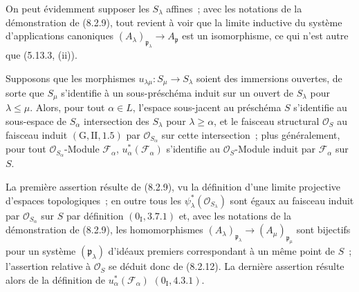On peut évidemment supposer les $S_\lambda$ affines~; avec les notations de
la démonstration de (8.2.9), tout revient à voir que la limite inductive du
système d'applications canoniques
$(A_\lambda)_{\mathfrak p_\lambda}\to A_{\mathfrak p}$ est un isomorphisme,
ce qui n'est autre que (5.13.3, (ii)).

\begin{proposition}[8.2.13]
\label{IV.8.2.13-fr}
Supposons que les morphismes $u_{\lambda\mu}:S_\mu\to S_\lambda$ soient des
immersions ouvertes, de sorte que $S_\mu$ s'identifie à un sous-préschéma
induit sur un ouvert de $S_\lambda$ pour $\lambda\leq\mu$. Alors, pour tout
$\alpha\in L$, l'espace sous-jacent au préschéma $S$ s'identifie au
sous-espace de $S_\alpha$ intersection des $S_\lambda$ pour
$\lambda\geq\alpha$, et le faisceau structural $\mathcal O_S$ au faisceau
induit $(\mathrm G,\mathrm{II},1.5)$ par $\mathcal O_{S_\alpha}$ sur cette
intersection~; plus généralement, pour tout $\mathcal O_{S_\alpha}$-Module
$\mathscr F_\alpha$, $u_\alpha^*(\mathscr F_\alpha)$ s'identifie au
$\mathcal O_S$-Module induit par $\mathscr F_\alpha$ sur $S$.
\end{proposition}

La première assertion résulte de (8.2.9), vu la définition d'une limite
projective d'espaces topologiques~; en outre tous les
$\psi_\lambda^*(\mathcal O_{S_\lambda})$ sont égaux au faisceau induit par
$\mathcal O_{S_\alpha}$ sur $S$ par définition $(0_{\mathrm I},3.7.1)$ et,
avec les notations de la démonstration de (8.2.9), les homomorphismes
$(A_\lambda)_{\mathfrak p_\lambda}\to
(A_\mu)_{\mathfrak p_\mu}$ sont bijectifs pour un système
$(\mathfrak p_\lambda)$ d'idéaux premiers correspondant à un même point de
$S$~; l'assertion relative à $\mathcal O_S$ se déduit donc de (8.2.12). La
dernière assertion résulte alors de la définition de
$u_\alpha^*(\mathscr F_\alpha)$ $(0_{\mathrm I},4.3.1)$.

